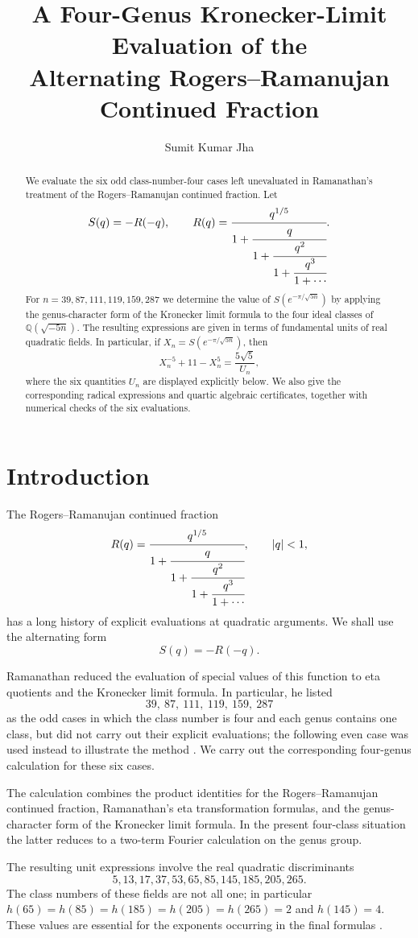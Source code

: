 \documentclass[11pt,a4paper]{article}
\title{A Four-Genus Kronecker-Limit Evaluation of the\\ Alternating Rogers--Ramanujan Continued Fraction}
\author{Sumit Kumar Jha}
\date{}
\begin{document}
\maketitle

\begin{abstract}
We evaluate the six odd class-number-four cases left unevaluated in Ramanathan's treatment of the Rogers--Ramanujan continued fraction.  Let
\[
 S(q)=-R(-q),\qquad
 R(q)=\cfrac{q^{1/5}}{1+\cfrac{q}{1+\cfrac{q^2}{1+\cfrac{q^3}{1+\cdots}}}}.
\]
For $n=39,87,111,119,159,287$ we determine the value of
$S(e^{-\pi/\sqrt{5n}})$ by applying the genus-character form of the Kronecker limit formula to the four ideal classes of $\mathbb Q(\sqrt{-5n})$.  The resulting expressions are given in terms of fundamental units of real quadratic fields.  In particular, if $X_n=S(e^{-\pi/\sqrt{5n}})$, then
\[
 X_n^{-5}+11-X_n^5=\frac{5\sqrt5}{U_n},
\]
where the six quantities $U_n$ are displayed explicitly below.  We also give the corresponding radical expressions and quartic algebraic certificates, together with numerical checks of the six evaluations.
\end{abstract}

\section{Introduction}
The Rogers--Ramanujan continued fraction
\[
R(q)=\cfrac{q^{1/5}}{1+\cfrac{q}{1+\cfrac{q^2}{1+\cfrac{q^3}{1+\cdots}}}},
\qquad |q|<1,
\]
has a long history of explicit evaluations at quadratic arguments.  We shall use the alternating form
\[
S(q)=-R(-q).
\]

Ramanathan reduced the evaluation of special values of this function to eta quotients and the Kronecker limit formula.  In particular, he listed
\[
39,\ 87,\ 111,\ 119,\ 159,\ 287
\]
as the odd cases in which the class number is four and each genus contains one class, but did not carry out their explicit evaluations; the following even case was used instead to illustrate the method \cite[p.~72]{Ramanathan1984}.  We carry out the corresponding four-genus calculation for these six cases.

The calculation combines the product identities for the Rogers--Ramanujan continued fraction, Ramanathan's eta transformation formulas, and the genus-character form of the Kronecker limit formula.  In the present four-class situation the latter reduces to a two-term Fourier calculation on the genus group.

The resulting unit expressions involve the real quadratic discriminants
\[
5,13,17,37,53,65,85,145,185,205,265.
\]
The class numbers of these fields are not all one; in particular
$h(65)=h(85)=h(185)=h(205)=h(265)=2$ and $h(145)=4$.  These values are essential for the exponents occurring in the final formulas \cite{Cohen1993}.
\end{document}
